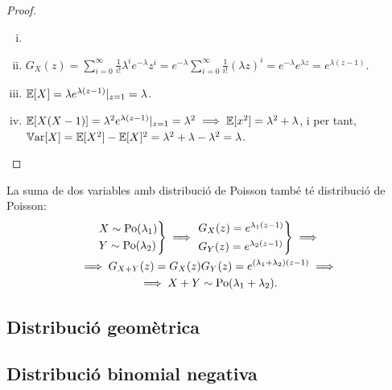 \begin{proof}
    \begin{enumerate}[i)]
        \item[]
        \item $G_X(z) = \sum\limits_{i=0}^\infty \frac{1}{i!}\lambda^i e^{-\lambda} z^i =
            e^{-\lambda} \sum\limits_{i=0}^\infty \frac{1}{i!}(\lambda z)^i = e^{-\lambda}e^{\lambda z} = e^{\lambda(z-1)}$.
        \item $\operatorname{\mathbb{E}}[X] = \lambda e^{\lambda(z-1)}|_{z=1} = \lambda$.
        \item $\operatorname{\mathbb{E}}[X(X-1)] = \lambda^2 e^{\lambda(z-1)}|_{z=1} = \lambda^2 \implies \operatorname{\mathbb{E}}[x^2] = \lambda^2+\lambda$,  i per tant, 
         $\operatorname{\mathbb{V}ar}[X] = \operatorname{\mathbb{E}}[X^2] - \operatorname{\mathbb{E}}[X]^2 = \lambda^2 + \lambda - \lambda^2 = \lambda$.
    \end{enumerate}
\end{proof}

\begin{obs} La suma de dos variables amb distribució de Poisson també té distribució de Poisson:
    \begin{gather*}
    \begin{rcases*} X \sim \operatorname{Po}(\lambda_1) \\ Y \sim \operatorname{Po}(\lambda_2) \end{rcases*} \implies
    \begin{rcases*} G_X(z) = e^{\lambda_1(z-1)} \\ G_Y(z) = e^{\lambda_2(z-1)} \end{rcases*}
    \implies \\
    \implies G_{X+Y}(z) = G_X(z)G_Y(z) = e^{(\lambda_1+\lambda_2)(z-1)} \implies \\
    \implies X+Y \sim \operatorname{Po}(\lambda_1+\lambda_2).
    \end{gather*}
\end{obs}

\subsection*{Distribució geomètrica}


\subsection*{Distribució binomial negativa}

